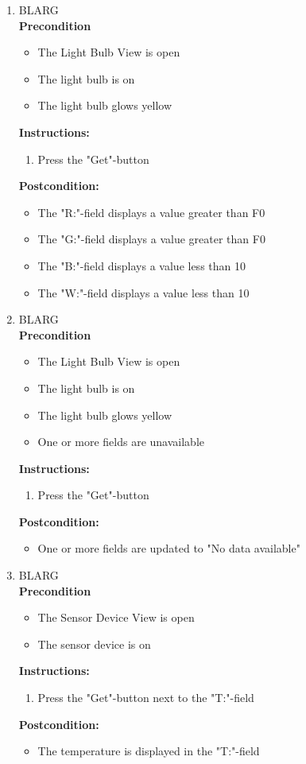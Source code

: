 \documentclass[a4paper]{article}
\newlength{\testlabellength}
\newenvironment{testlist}{\begin{enumerate}[label=\bfseries Instruction \thesubsection.\arabic* , labelindent=0pt, labelwidth=\testlabellength , leftmargin=2cm]}{\end{enumerate}}
\newenvironment{precondition}{
{\color{white}BLARG}\\ 
\textbf{Precondition}
\begin{itemize}[labelindent=0cm, labelwidth=2cm , leftmargin=1cm]
}
{\end{itemize}}
\newenvironment{instruction}{
\textbf{Instructions:}
\begin{enumerate}[label=\bfseries  \arabic*., labelindent=0cm, labelwidth=2cm , leftmargin=1cm]
}
{\end{enumerate}}
\newenvironment{postcondition}{
\textbf{Postcondition:}
\begin{itemize}[labelindent=0cm, labelwidth=2cm , leftmargin=1cm]
}
{\end{itemize}}
\begin{document}
\begin{appendices}
\begin{testlist}
	\item
		\begin{precondition}
			\item The Light Bulb View is open
			\item The light bulb is on
			\item The light bulb glows yellow
		\end{precondition}
		\begin{instruction}
			\item Press the "Get"-button
		\end{instruction}
		\begin{postcondition}
			\item The "R:"-field displays a value greater than F0
			\item The "G:"-field displays a value greater than F0
			\item The "B:"-field displays a value less than 10
			\item The "W:"-field displays a value less than 10
		\end{postcondition}

	\item
		\begin{precondition}
			\item The Light Bulb View is open
			\item The light bulb is on
			\item The light bulb glows yellow
			\item One or more fields are unavailable
		\end{precondition}
		\begin{instruction}
			\item Press the "Get"-button
		\end{instruction}
		\begin{postcondition}
			\item One or more fields are updated to "No data available"
		\end{postcondition}

	\item
		\begin{precondition}
			\item The Sensor Device View is open
			\item The sensor device is on
		\end{precondition}
		\begin{instruction}
			\item Press the "Get"-button next to the "T:"-field
		\end{instruction}
		\begin{postcondition}
			\item The temperature is displayed in the "T:"-field
		\end{postcondition}


\end{testlist}
\end{appendices}
\end{document}
